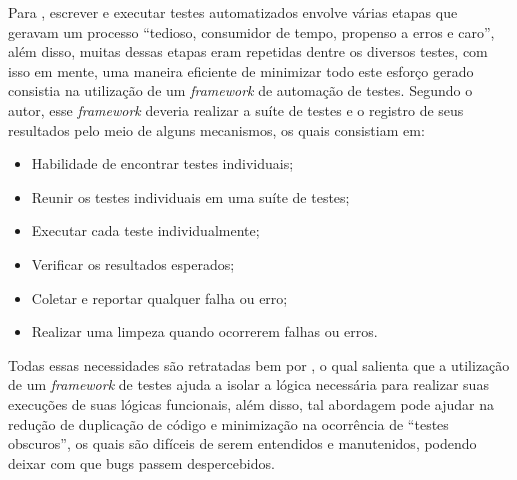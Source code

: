         Para , escrever e executar testes automatizados envolve várias etapas que geravam um processo “tedioso, consumidor de tempo, propenso a erros e caro”, além disso, muitas dessas etapas eram repetidas dentre os diversos testes, com isso em mente, uma maneira eficiente de minimizar todo este esforço gerado consistia na utilização de um \textit{framework} de automação de testes. Segundo o autor, esse \textit{framework} deveria realizar a suíte de testes e o registro de seus resultados pelo meio de alguns mecanismos, os quais consistiam em:

        \begin{itemize}

        \item Habilidade de encontrar testes individuais;
        \item Reunir os testes individuais em uma suíte de testes;
        \item Executar cada teste individualmente;
        \item Verificar os resultados esperados;
        \item Coletar e reportar qualquer falha ou erro;
        \item Realizar uma limpeza quando ocorrerem falhas ou erros.

        \end{itemize}

        Todas essas necessidades são retratadas bem por , o qual salienta que a utilização de um \textit{framework} de testes ajuda a isolar a lógica necessária para realizar suas execuções de suas lógicas funcionais, além disso, tal abordagem pode ajudar na redução de duplicação de código e minimização na ocorrência de “testes obscuros”, os quais são difíceis de serem entendidos e manutenidos, podendo deixar com que bugs passem despercebidos.
